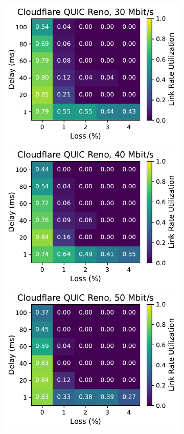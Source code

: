 \begin{figure}[ht]
\begin{subfigure}[b]{0.22\linewidth}
        \includegraphics[width=\linewidth,trim={0 0 2cm 0},clip]{figures/heatmaps/heatmap_quiche_reno_30mbps.pdf}
        \includegraphics[width=\linewidth,trim={0 0 2cm 0},clip]{figures/heatmaps/heatmap_quiche_reno_40mbps.pdf}
        \includegraphics[width=\linewidth,trim={0 0 2cm 0},clip]{figures/heatmaps/heatmap_quiche_reno_50mbps.pdf}

\end{subfigure}
\end{figure}
